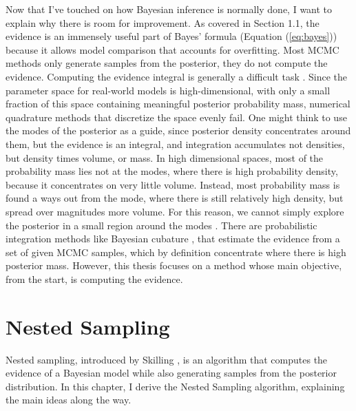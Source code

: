 \documentclass[12pt, a4paper]{report}
\begin{document}
Now that I've touched on how Bayesian inference is normally done, I want to explain why there is room for improvement.
As covered in Section 1.1, the evidence is an immensely useful part of Bayes' formula (Equation (\ref{eq:bayes})) because it allows model comparison that accounts for overfitting.
Most MCMC methods only generate samples from the posterior, they do not compute the evidence.
Computing the evidence integral is generally a difficult task \cite[221]{mcelreath}.
Since the parameter space for real-world models is high-dimensional, with only a small fraction of this space containing meaningful posterior probability mass, numerical quadrature methods that discretize the space evenly fail.
One might think to use the modes of the posterior as a guide, since posterior density concentrates around them, but the evidence is an integral, and integration accumulates not densities, but density times volume, or mass.
In high dimensional spaces, most of the probability mass lies not at the modes, where there is high probability density, because it concentrates on very little volume.
Instead, most probability mass is found a ways out from the mode, where there is still relatively high density, but spread over magnitudes more volume.
For this reason, we cannot simply explore the posterior in a small region around the modes \cite{betancourt_talk}.
There are probabilistic integration methods like Bayesian cubature \cite{bayesian_cubature}, that estimate the evidence from a set of given MCMC samples, which by definition concentrate where there is high posterior mass.
However, this thesis focuses on a method whose main objective, from the start, is computing the evidence.


\section{Nested Sampling}
Nested sampling, introduced by Skilling \cite{skilling}, is an algorithm that computes the evidence of a Bayesian model while also generating samples from the posterior distribution.
In this chapter, I derive the Nested Sampling algorithm, explaining the main ideas along the way.

\FloatBarrier
\end{document}
